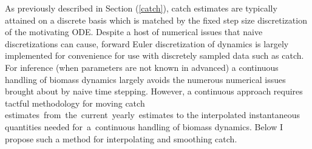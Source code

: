 \documentclass[12pt]{article}
\begin{document}

As previously described in Section (\ref{catch}), catch estimates are 
typically attained on a discrete basis which is matched by the fixed step size 
discretization of the motivating ODE. Despite a host of numerical issues that
naive discretizations can cause, forward Euler discretization of dynamics is 
largely implemented for convenience for use with discretely sampled data such as 
catch. For inference (when parameters are not known in advanced) a continuous 
handling of biomass dynamics largely avoids the numerous numerical issues 
brought about by naive time stepping. However, a continuous approach requires 
tactful methodology for moving catch \mbox{estimates from the current yearly estimates} to the interpolated instantaneous quantities needed \mbox{for a continuous} 
handling of biomass dynamics. Below I propose such a method for interpolating 
and smoothing catch.


\end{document}
